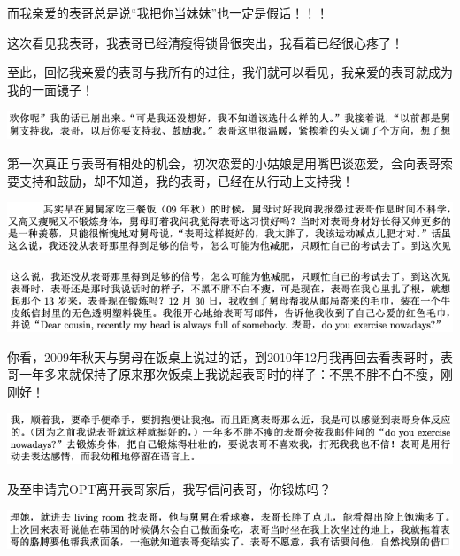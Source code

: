 \documentclass[9pt, b5paper]{article}
\begin{document}
而我亲爱的表哥总是说“我把你当妹妹”也一定是假话！！！

这次看见我表哥，我表哥已经清瘦得锁骨很突出，我看着已经很心疼了！

至此，回忆我亲爱的表哥与我所有的过往，我们就可以看见，我亲爱的表哥就成为我的一面镜子！

\begin{center}
\includegraphics[width=.9\linewidth]{./pic/p1p43-2.png}
\end{center}

第一次真正与表哥有相处的机会，初次恋爱的小姑娘是用嘴巴谈恋爱，会向表哥索要支持和鼓励，却不知道，我的表哥，已经在从行动上支持我！

\begin{center}
\includegraphics[width=.9\linewidth]{./pic/p1p45-4.png}
\end{center}

\begin{center}
\includegraphics[width=.9\linewidth]{./pic/p1p45-5.png}
\end{center}

你看，2009年秋天与舅母在饭桌上说过的话，到2010年12月我再回去看表哥时，表哥一年多来就保持了原来那次饭桌上我说起表哥时的样子：不黑不胖不白不瘦，刚刚好！

\begin{center}
\includegraphics[width=.9\linewidth]{./pic/p1p137-4.png}
\end{center}

及至申请完OPT离开表哥家后，我写信问表哥，你锻炼吗？

\begin{center}
\includegraphics[width=.9\linewidth]{./pic/p1p49-5.png}
\end{center}
\end{document}
